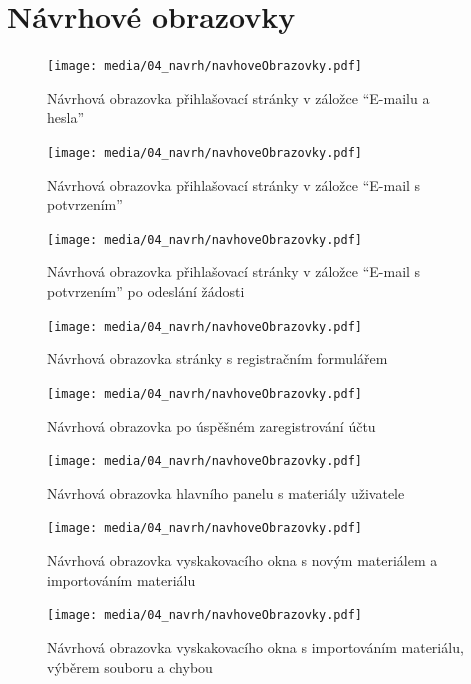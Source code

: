 \chapter{Návrhové obrazovky}\label{appendix:navrhoveObrazovky}



\begin{figure}[ht!]
    \centering
    \texttt{[image: media/04\_navrh/navhoveObrazovky.pdf]}
    \caption{Návrhová obrazovka přihlašovací stránky v záložce \enquote{E-mailu a hesla}}
\end{figure}

\begin{figure}[ht!]
    \centering
    \texttt{[image: media/04\_navrh/navhoveObrazovky.pdf]}
    \caption{Návrhová obrazovka přihlašovací stránky v záložce \enquote{E-mail s potvrzením}}
\end{figure}

\begin{figure}[ht!]
    \centering
    \texttt{[image: media/04\_navrh/navhoveObrazovky.pdf]}
    \caption{Návrhová obrazovka přihlašovací stránky v záložce \enquote{E-mail s potvrzením} po odeslání žádosti}
\end{figure}



\begin{figure}[ht!]
    \centering
    \texttt{[image: media/04\_navrh/navhoveObrazovky.pdf]}
    \caption{Návrhová obrazovka stránky s registračním formulářem}
\end{figure}

\begin{figure}[ht!]
    \centering
    \texttt{[image: media/04\_navrh/navhoveObrazovky.pdf]}
    \caption{Návrhová obrazovka po úspěšném zaregistrování účtu}
\end{figure}

\begin{figure}[ht!]
    \centering
    \texttt{[image: media/04\_navrh/navhoveObrazovky.pdf]}
    \caption{Návrhová obrazovka hlavního panelu s materiály uživatele}
\end{figure}

\begin{figure}[ht!]
    \centering
    \texttt{[image: media/04\_navrh/navhoveObrazovky.pdf]}
    \caption{Návrhová obrazovka vyskakovacího okna s novým materiálem a importováním materiálu}
\end{figure}

\begin{figure}[ht!]
    \centering
    \texttt{[image: media/04\_navrh/navhoveObrazovky.pdf]}
    \caption{Návrhová obrazovka vyskakovacího okna s importováním materiálu, výběrem souboru a chybou}
\end{figure}


